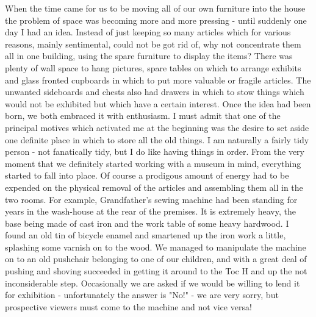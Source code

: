 When the time came for us to be moving all of our own furniture into the house the problem of space was becoming more and more pressing - until suddenly one day I had an idea. Instead of just keeping so many articles which for various reasons, mainly sentimental, could not be got rid of, why not concentrate them all in one building, using the spare furniture to display the items? There was plenty of wall space to hang pictures, spare tables on which to arrange exhibits and glass fronted cupboards in which to put more valuable or fragile articles. The unwanted sideboards and chests also had drawers in which to stow things which would not be exhibited but which have a certain interest. Once the idea had been born, we both embraced it with enthusiasm. I must admit that one of the principal motives which activated me at the beginning was the desire to set aside one definite place in which to store all the old things. I am naturally a fairly tidy person - not fanatically tidy, but I do like having things in order. From the very moment that we definitely started working with a museum in mind, everything started to fall into place. Of course a prodigous amount of energy had to be expended on the physical removal of the articles and assembling them all in the two rooms. For example, Grandfather's sewing machine had been standing for years in the wash-house at the rear of the premises. It is extremely heavy, the base being made of cast iron and the work table of some heavy hardwood. I found an old tin of bicycle enamel and smartened up the iron work a little, splashing some varnish on to the wood. We managed to manipulate the machine on to an old pushchair belonging to one of our children, and with a great deal of pushing and shoving succeeded in getting it around to the Toc H and up the not inconsiderable step. Occasionally we are asked if we would be willing to lend it for exhibition - unfortunately the answer is "No!" - we are very sorry, but prospective viewers must come to the machine and not vice versa!

